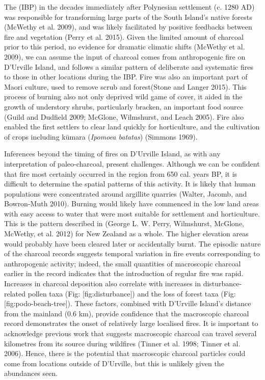 The (IBP) in the decades immediately after Polynesian settlement (c.
1280 AD) was responsible for transforming large parts of the South
Island's native forests (McWethy et al. 2009), and was likely
facilitated by positive feedbacks between fire and vegetation (Perry et
al. 2015). Given the limited amount of charcoal prior to this period, no
evidence for dramatic climatic shifts (McWethy et al. 2009), we can
assume the input of charcoal comes from anthropogenic fire on D'Urville
Island, and follows a similar pattern of deliberate and systematic fires
to those in other locations during the IBP. Fire was also an important
part of Maori culture, used to remove scrub and forest(Stone and Langer
2015). This process of burning also not only deprived wild game of
cover, it aided in the growth of understory shrubs, particularly
bracken, an important food source (Guild and Dudfield 2009; McGlone,
Wilmshurst, and Leach 2005). Fire also enabled the first settlers to
clear land quickly for horticulture, and the cultivation of crops
including kūmara (\emph{Ipomoea batatas}) (Simmons 1969).

Inferences beyond the timing of fires on D'Urville Island, as with any
interpretation of paleo-charcoal, present challenges. Although we can be
confident that fire most certainly occurred in the region from 650 cal.
years BP, it is difficult to determine the spatial patterns of this
activity. It is likely that human populations were concentrated around
argillite quarries (Walter, Jacomb, and Bowron-Muth 2010). Burning would
likely have commenced in the low land areas with easy access to water
that were most suitable for settlement and horticulture. This is the
pattern described in (George L. W. Perry, Wilmshurst, McGlone, McWethy,
et al. 2012) for New Zealand as a whole. The higher elevation areas
would probably have been cleared later or accidentally burnt. The
episodic nature of the charcoal records suggests temporal variation in
fire events corresponding to anthropogenic activity; indeed, the small
quantities of macroscopic charcoal earlier in the record indicates that
the introduction of regular fire was rapid. Increases in charcoal
deposition also correlate with increases in disturbance-related pollen
taxa (Fig: {[}fig:disturbance{]}) and the loss of forest taxa (Fig:
{[}fig:podo-beach-tree{]}). These factors, combined with D'Urville
Island's distance from the mainland (0.6 km), provide confidence that
the macroscopic charcoal record demonstrates the onset of relatively
large localised fires. It is important to acknowledge previous work that
suggests macroscopic charcoal can travel several kilometres from its
source during wildfires (Tinner et al. 1998; Tinner et al. 2006). Hence,
there is the potential that macroscopic charcoal particles could come
from locations outside of D'Urville, but this is unlikely given the
abundances seen.

